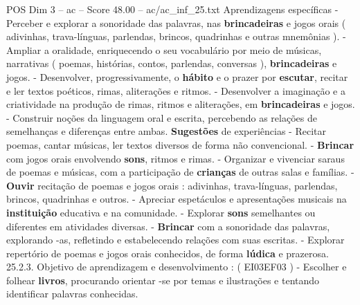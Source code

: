 \begin{textsample}{POS Dim 3 – ac – Score 48.00 – ac/ac\_inf\_25.txt}
Aprendizagens específicas - Perceber e explorar a sonoridade das palavras, nas \textbf{brincadeiras} e jogos orais ( adivinhas, trava-línguas, parlendas, brincos, quadrinhas e outras mnemônias ). - Ampliar a oralidade, enriquecendo o seu vocabulário por meio de músicas, narrativas ( poemas, histórias, contos, parlendas, conversas ), \textbf{brincadeiras} e jogos. - Desenvolver, progressivamente, o \textbf{hábito} e o prazer por \textbf{escutar}, recitar e ler textos poéticos, rimas, aliterações e ritmos. - Desenvolver a imaginação e a criatividade na produção de rimas, ritmos e aliterações, em \textbf{brincadeiras} e jogos. - Construir noções da linguagem oral e escrita, percebendo as relações de semelhanças e diferenças entre ambas. \textbf{Sugestões} de experiências - Recitar poemas, cantar músicas, ler textos diversos de forma não convencional. - \textbf{Brincar} com jogos orais envolvendo \textbf{sons}, ritmos e rimas. - Organizar e vivenciar saraus de poemas e músicas, com a participação de \textbf{crianças} de outras salas e famílias. - \textbf{Ouvir} recitação de poemas e jogos orais : adivinhas, trava-línguas, parlendas, brincos, quadrinhas e outros. - Apreciar espetáculos e apresentações musicais na \textbf{instituição} educativa e na comunidade. - Explorar \textbf{sons} semelhantes ou diferentes em atividades diversas. - \textbf{Brincar} com a sonoridade das palavras, explorando -as, refletindo e estabelecendo relações com suas escritas. - Explorar repertório de poemas e jogos orais conhecidos, de forma \textbf{lúdica} e prazerosa. 25.2.3.
Objetivo de aprendizagem e desenvolvimento : ( EI03EF03 ) - Escolher e folhear \textbf{livros}, procurando orientar -se por temas e ilustrações e tentando identificar palavras conhecidas.

\end{textsample}
